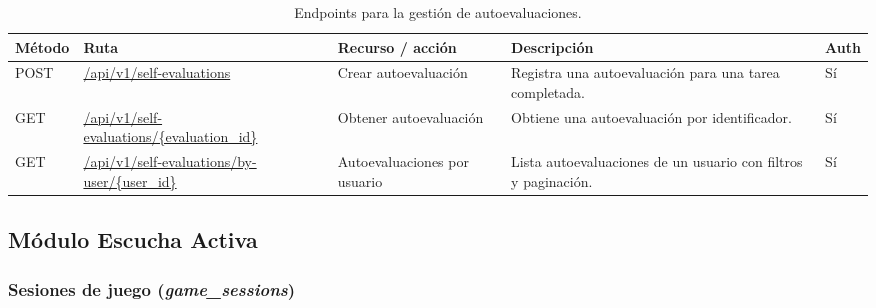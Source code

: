 \begin{table}[H]
\centering
\footnotesize
\setlength{\tabcolsep}{4pt}
\renewcommand{\arraystretch}{1.25}
\begin{tabular}{|p{1.4cm}|p{4.1cm}|p{3.2cm}|p{5.8cm}|p{1cm}|}
\hline
\textbf{Método} & \textbf{Ruta} & \textbf{Recurso / acción} & \textbf{Descripción} & \textbf{Auth} \\
\hline

POST & \url{/api/v1/self-evaluations} & Crear autoevaluación &
Registra una autoevaluación para una tarea completada. &
Sí \\
\hline

GET & \url{/api/v1/self-evaluations/{evaluation\_id}} & Obtener autoevaluación &
Obtiene una autoevaluación por identificador. &
Sí \\
\hline

GET & \url{/api/v1/self-evaluations/by-user/{user\_id}} & Autoevaluaciones por usuario &
Lista autoevaluaciones de un usuario con filtros y paginación. &
Sí \\
\hline

\end{tabular}
\caption{Endpoints para la gestión de autoevaluaciones.}
\end{table}

\subsection*{Módulo Escucha Activa}

\subsubsection*{Sesiones de juego (\textit{game\_sessions})}

